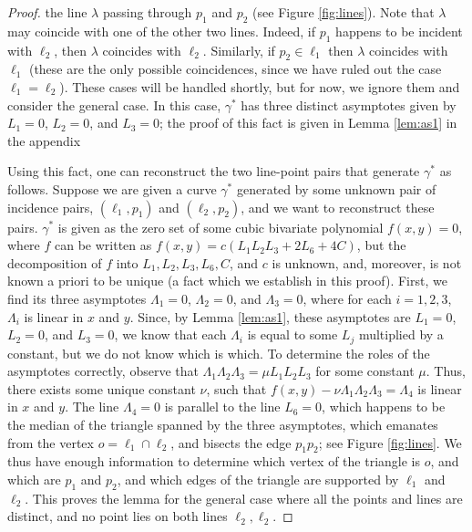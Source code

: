 \documentclass[12pt]{article}
\begin{document}
\begin{proof}
the line $\lambda$ passing through $p_1$ and $p_2$ (see Figure
\ref{fig:lines}). Note that $\lambda$ may coincide with one of the
other two lines.
Indeed, if $p_1$ happens to be incident with $\ell_2$, then $\lambda$
coincides with $\ell_2$. Similarly, if $p_2 \in \ell_1$ then $\lambda$
coincides with $\ell_1$ (these are the only possible coincidences,
since we have ruled out the case $\ell_1 = \ell_2$).
These cases will be handled shortly, but for now, we ignore them and
consider the general
case. In this case, $\gamma^*$ has three distinct asymptotes given by
$L_1=0$, $L_2=0$, and $L_3=0$; the proof of this fact is given in Lemma
\ref{lem:as1} in the appendix

Using this fact, one can reconstruct the two line-point pairs that
generate $\gamma^*$ as follows.
Suppose we are given a curve $\gamma^*$ generated by some unknown
pair of incidence pairs, $(\ell_1, p_1)$ and $(\ell_2,p_2)$, and
we want to reconstruct these pairs.
$\gamma^*$ is given as the zero set of some cubic bivariate polynomial
$f(x,y) = 0$, where $f$ can be written as $f(x,y) =
c(L_1 L_2 L_3 + 2L_6 + 4C)$, but the decomposition of $f$
into $L_1, L_2, L_3, L_6, C$, and $c$ is unknown, and, moreover,
is not known a priori to be unique (a fact which we establish in this
proof).
First, we find its three asymptotes $\Lambda_1 = 0$, $\Lambda_2 = 0$,
and $\Lambda_3 = 0$, where for each $i=1,2,3$,
$\Lambda_i$ is linear in $x$ and $y$.
Since, by Lemma \ref{lem:as1}, these asymptotes are $L_1 = 0$, $L_2 = 0$,
and $L_3 = 0$, we know that each $\Lambda_i$ is equal to some $L_j$
multiplied by a constant, but we do not know which is which.
To determine the roles of the asymptotes correctly, observe that
$\Lambda_1 \Lambda_2 \Lambda_3 = \mu L_1 L_2 L_3$ for some constant
$\mu$. Thus, there exists some unique constant $\nu$, such that
$f(x,y) - \nu \Lambda_1 \Lambda_2 \Lambda_3 = \Lambda_4$ is linear in
$x$ and $y$. The line $\Lambda_4 = 0$ is parallel to the line $L_6 = 0$,
which happens to be the median of the triangle spanned by the three
asymptotes, which emanates from the vertex $o = \ell_1 \cap \ell_2$, and
bisects the edge $p_1p_2$; see Figure \ref{fig:lines}.
We thus have enough information to determine which vertex of the
triangle is $o$, and which are $p_1$ and $p_2$, and which edges of the
triangle are supported by $\ell_1$ and $\ell_2$.
This proves the lemma for the general case where all the points
and lines are distinct, and no point lies on both lines $\ell_2, \ell_2$.


\end{proof}
\end{document}
